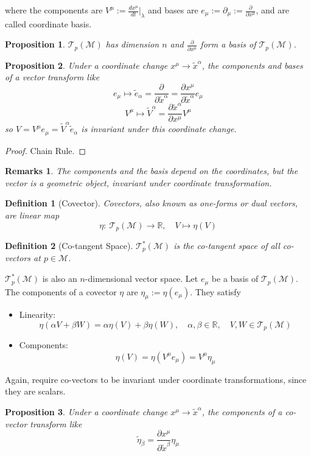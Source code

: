 \documentclass[a4paper]{article}
\newtheorem{remarks}{Remarks}[section]
\theoremstyle{new}
\newtheorem{defi}{Definition}[section]
\newtheorem{prop}{Proposition}[section]
\begin{document}
where the components are $V^\mu:=\frac{dx^\mu}{dt}|_\lambda$ and bases are $e_\mu:=\partial_\mu:=\frac{\partial }{\partial x^\mu}$, and are called coordinate basis.
\begin{prop}
$\mathcal{T}_p(\mathcal{M})$ has dimension $n$ and $\frac{\partial}{\partial x^\mu}$ form a basis of $\mathcal{T}_p(\mathcal{M})$.
\end{prop}
\begin{prop}
Under a coordinate change $x^\mu\rightarrow\tilde{x}^\alpha$, the components and bases of a vector transform like
$$e_\mu\mapsto\tilde{e}_\alpha=\frac{\partial}{\partial\tilde{x}^\alpha}=\frac{\partial x^\mu}{\partial\tilde{x}^\alpha}e_\mu$$
$$V^\mu\mapsto\tilde{V}^\alpha=\frac{\partial\tilde{x}^\alpha}{\partial x^\mu}V^\mu$$
so $V=V^\mu e_\mu=\tilde{V}^\alpha\tilde{e}_\alpha$ is invariant under this coordinate change.
\end{prop}
\begin{proof}
Chain Rule.
\end{proof}
\begin{remarks}
The components and the basis depend on the coordinates, but the vector is a geometric object, invariant under coordinate transformation. 
\end{remarks}
\begin{defi}[Covector]
Covectors, also known as one-forms or dual vectors, are linear map 
$$\eta:~\mathcal{T}_p(\mathcal{M})\rightarrow\mathbb{R},\quad V\mapsto\eta(V)$$
\end{defi}
\begin{defi}[Co-tangent Space]
$\mathcal{T}_p^*(\mathcal{M})$ is the co-tangent space of all co-vectors at $p\in\mathcal{M}$.
\end{defi}
$\mathcal{T}_p^*(\mathcal{M})$ is also an $n$-dimensional vector space. Let $e_\mu$ be a basis of $\mathcal{T}_p(\mathcal{M})$. The components of a covector $\eta$ are $\eta_\mu:=\eta(e_\mu)$. They satisfy
\begin{itemize}
    \item Linearity: 
    $$\eta(\alpha V+\beta W)=\alpha\eta(V)+\beta\eta(W),\quad\alpha,\beta\in\mathbb{R},\quad V,W\in\mathcal{T}_p(\mathcal{M})$$
    \item Components:
    $$\eta(V)=\eta(V^\mu e_\mu)=V^\mu\eta_\mu$$
\end{itemize}
Again, require co-vectors to be invariant under coordinate transformations, since they are scalars.
\begin{prop}
Under a coordinate change $x^\mu\rightarrow\tilde{x}^\alpha$, the components of a co-vector transform like
$$\tilde{\eta}_\beta=\frac{\partial x^\mu}{\partial\tilde{x}^\beta}\eta_\mu$$
\end{prop}
\end{document}
